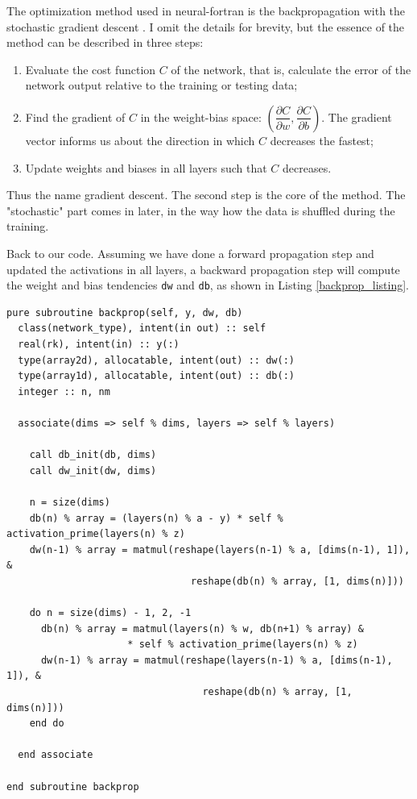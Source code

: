 \documentclass[sigplan, review=false, screen=true, balance=true]{acmart}
\begin{document}
The optimization method used in neural-fortran is the backpropagation with the
stochastic gradient descent \citep{rumelhart86}. I omit the details for brevity,
but the essence of the method can be described in three steps:

\begin{enumerate}
  \item Evaluate the cost function $C$ of the network, that is, calculate the error
  of the network output relative to the training or testing data;
  \item Find the gradient of $C$ in the weight-bias space: $\left( \dfrac{\partial C}{\partial w}, \dfrac{\partial C}{\partial b} \right)$. The gradient vector informs us about
  the direction in which $C$ decreases the fastest;
  \item Update weights and biases in all layers such that $C$ decreases.
\end{enumerate}

Thus the name gradient descent. The second step is the core of the method.
The "stochastic" part comes in later, in the way how the data is shuffled
during the training.

Back to our code. Assuming we have done a forward propagation step and updated
the activations in all layers, a backward propagation step will compute
the weight and bias tendencies \lstinline{dw} and \lstinline{db}, as shown in
Listing \ref{backprop_listing}.

\begin{lstlisting}[caption={A subroutine to perform the backpropagation using gradient descent, and return the weight and bias tendencies.}, captionpos=b, float=*h, label={backprop_listing}]
pure subroutine backprop(self, y, dw, db)
  class(network_type), intent(in out) :: self
  real(rk), intent(in) :: y(:)
  type(array2d), allocatable, intent(out) :: dw(:)
  type(array1d), allocatable, intent(out) :: db(:)
  integer :: n, nm

  associate(dims => self % dims, layers => self % layers)

    call db_init(db, dims)
    call dw_init(dw, dims)

    n = size(dims)
    db(n) % array = (layers(n) % a - y) * self % activation_prime(layers(n) % z)
    dw(n-1) % array = matmul(reshape(layers(n-1) % a, [dims(n-1), 1]), &
                                reshape(db(n) % array, [1, dims(n)]))

    do n = size(dims) - 1, 2, -1
      db(n) % array = matmul(layers(n) % w, db(n+1) % array) &
                     * self % activation_prime(layers(n) % z)
      dw(n-1) % array = matmul(reshape(layers(n-1) % a, [dims(n-1), 1]), &
                                  reshape(db(n) % array, [1, dims(n)]))
    end do

  end associate

end subroutine backprop
\end{lstlisting}
\end{document}
